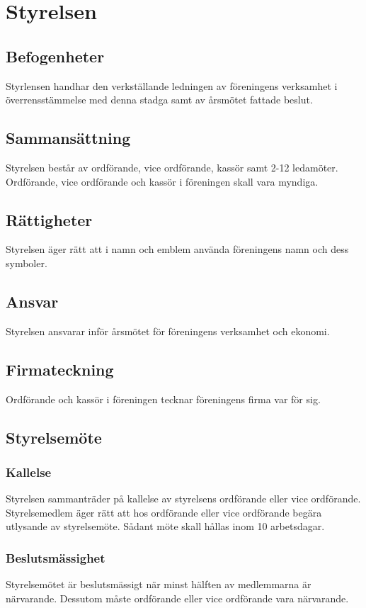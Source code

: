 \section{Styrelsen}
\subsection{Befogenheter} 
Styrlensen handhar den verkställande ledningen av föreningens verksamhet i överrensstämmelse med denna stadga samt av årsmötet fattade beslut. 

\subsection{Sammansättning}
Styrelsen består av ordförande, vice ordförande, kassör samt 2-12 ledamöter. 
Ordförande, vice ordförande och kassör i föreningen skall vara myndiga. 

\subsection{Rättigheter}
Styrelsen äger rätt att i namn och emblem använda föreningens namn och dess symboler.

\subsection{Ansvar}
Styrelsen ansvarar inför årsmötet för föreningens verksamhet och ekonomi.

\subsection{Firmateckning}
Ordförande och kassör i föreningen tecknar föreningens firma var för sig. 

\subsection{Styrelsemöte}
\subsubsection{Kallelse}
Styrelsen sammanträder på kallelse av styrelsens ordförande eller vice ordförande. Styrelsemedlem äger rätt att hos ordförande eller vice ordförande begära utlysande av styrelsemöte. Sådant möte skall hållas inom 10 arbetsdagar. 

\subsubsection{Beslutsmässighet}
Styrelsemötet är beslutsmässigt när minst hälften av medlemmarna är närvarande. Dessutom måste ordförande eller vice ordförande vara närvarande.
